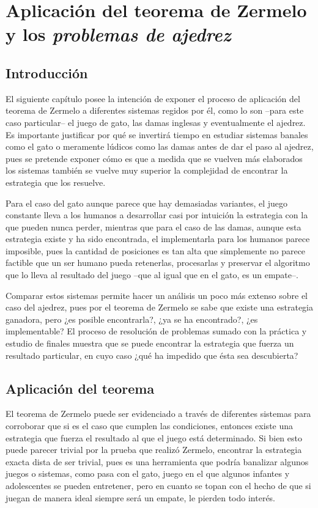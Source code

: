 \documentclass[twoside,openright,12pt,a4paper,spanish]{book}
\begin{document}
\chapter{Aplicación del teorema de Zermelo y los \textit{problemas de ajedrez}}
\section{Introducción}

\noindent El siguiente capítulo posee la intenci\'on de exponer el proceso de aplicaci\'on del teorema de Zermelo a diferentes sistemas regidos por \'el, como lo son --para este caso particular-- el juego de gato, las damas inglesas y eventualmente el ajedrez. Es importante justificar por qu\'e se invertir\'a tiempo en estudiar sistemas banales como el gato o meramente l\'udicos como las damas antes de dar el paso al ajedrez, pues se pretende exponer cómo es que a medida que se vuelven m\'as elaborados los sistemas tambi\'en se vuelve muy superior la complejidad de encontrar la estrategia que los resuelve.

Para el caso del gato aunque parece que hay demasiadas variantes, el juego constante lleva a los humanos a desarrollar casi por intuici\'on la estrategia con la que pueden nunca perder, mientras que para el caso de las damas, aunque esta estrategia existe y ha sido encontrada, el implementarla para los humanos parece imposible, pues la cantidad de posiciones es tan alta que simplemente no parece factible que un ser humano pueda retenerlas, procesarlas y preservar el algoritmo que lo lleva al resultado del juego --que al igual que en el gato, es un empate--.

Comparar estos sistemas permite hacer un an\'alisis un poco m\'as extenso sobre el caso del ajedrez, pues por el teorema de Zermelo se sabe que existe una estrategia ganadora, pero ¿es posible encontrarla?, ¿ya se ha encontrado?, ¿es implementable? El proceso de resolución de problemas sumado con la práctica y estudio de finales muestra que se puede encontrar la estrategia que fuerza un resultado particular, en cuyo caso ¿qué ha impedido que ésta sea descubierta?

\section{Aplicación del teorema}

\noindent El teorema de Zermelo puede ser evidenciado a trav\'es de diferentes sistemas para corroborar que si es el caso que cumplen las condiciones, entonces existe una estrategia que fuerza el resultado al que el juego est\'a determinado. Si bien esto puede parecer trivial por la prueba que realiz\'o Zermelo, encontrar la estrategia exacta dista de ser trivial, pues es una herramienta que podr\'ia banalizar algunos juegos o sistemas, como pasa con el gato, juego en el que algunos infantes y adolescentes se pueden entretener, pero en cuanto se topan con el hecho de que si juegan de manera ideal siempre ser\'a un empate, le pierden todo inter\'es. 
\end{document}
